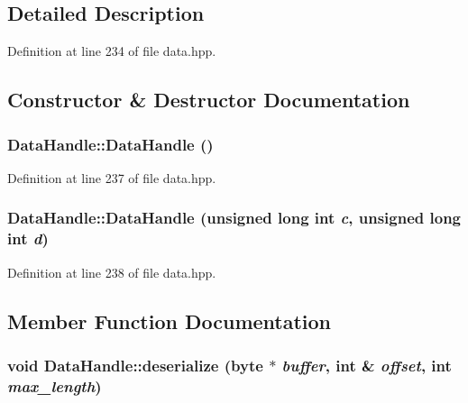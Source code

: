 \subsection{Detailed Description}


Definition at line 234 of file data.hpp.

\subsection{Constructor \& Destructor Documentation}
\hypertarget{struct_data_handle_a1b1c698a78fb66cf90af8b2a926ab041}{
\subsubsection[{DataHandle}]{\setlength{\rightskip}{0pt plus 5cm}DataHandle::DataHandle ()}}
\label{struct_data_handle_a1b1c698a78fb66cf90af8b2a926ab041}


Definition at line 237 of file data.hpp.\hypertarget{struct_data_handle_a7c654e8712517c6fdf0fcab379d53b76}{
\subsubsection[{DataHandle}]{\setlength{\rightskip}{0pt plus 5cm}DataHandle::DataHandle (unsigned long int {\em c}, \/  unsigned long int {\em d})}}
\label{struct_data_handle_a7c654e8712517c6fdf0fcab379d53b76}


Definition at line 238 of file data.hpp.

\subsection{Member Function Documentation}
\hypertarget{struct_data_handle_a4abd5569c8a2cb0ff6fdca749765aa70}{
\subsubsection[{deserialize}]{\setlength{\rightskip}{0pt plus 5cm}void DataHandle::deserialize ({\bf byte} $\ast$ {\em buffer}, \/  int \& {\em offset}, \/  int {\em max\_\-length})}}
\label{struct_data_handle_a4abd5569c8a2cb0ff6fdca749765aa70}


